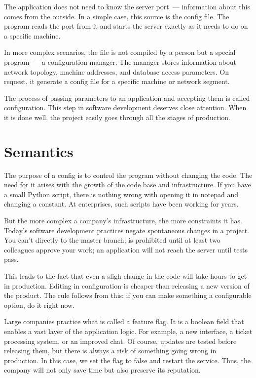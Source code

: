 The application does not need to know the server port~--- information about this comes from the outside. In a simple case, this source is the config file. The program reads the port from it and starts the server exactly as it needs to do on a specific machine.


In more complex scenarios, the file is not compiled by a person but a special program~--- a configuration manager. The manager stores information about network topology, machine addresses, and database access parameters. On request, it generate a config file for a specific machine or network segment.

The process of passing parameters to an application and accepting them is called configuration. This step in software development deserves close attention. When it is done well, the project easily goes through all the stages of production.

\section{ Semantics}

The purpose of a config is to control the program without changing the code. The need for it arises with the growth of the code base and infrastructure. If you have a small Python script, there is nothing wrong with opening it in notepad and changing a constant. At enterprises, such scripts have been working for years.

But the more complex a company's infrastructure, the more constraints it has. Today's software development practices negate spontaneous changes in a project. You can't  directly to the master branch;  is prohibited until at least two colleagues approve your work; an application will not reach the server until tests pass.

This leads to the fact that even a sligh change in the code will take hours to get in production. Editing in configuration is cheaper than releasing a new version of the product. The rule follows from this: if you can make something a configurable option, do it right now.


Large companies practice what is called a feature flag. It is a boolean field that enables a vast layer of the application logic. For example, a new interface, a ticket processing system, or an improved chat. Of course, updates are tested before releasing them, but there is always a risk of something going wrong in production. In this case, we set the flag to false and restart the service. Thus, the company will not only save time but also preserve its reputation.


